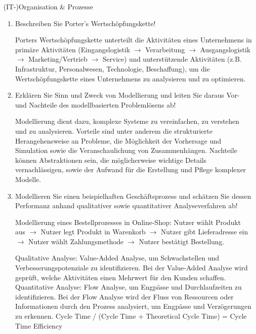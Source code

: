 \documentclass{article}
\begin{document}
\begin{exercise}{(IT-)Organisation \& Prozesse}
  \begin{enumerate}
    \item Beschreiben Sie Porter's Wertschöpfungskette!
          \begin{solution}
            Porters Wertschöpfungskette unterteilt die Aktivitäten eines Unternehmens in primäre Aktivitäten (Eingangslogistik $\to$ Verarbeitung $\to$ Ausgangslogistik $\to$ Marketing/Vertrieb $\to$ Service) und unterstützende Aktivitäten (z.B. Infrastruktur, Personalwesen, Technologie, Beschaffung), um die Wertschöpfungskette eines Unternehmens zu analysieren und zu optimieren.
          \end{solution}

    \item Erklären Sie Sinn und Zweck von Modellierung und leiten Sie daraus Vor- und Nachteile des modellbasierten Problemlösens ab!
          \begin{solution}
            Modellierung dient dazu, komplexe Systeme zu vereinfachen, zu verstehen und zu analysieren. Vorteile sind unter anderem die strukturierte Herangehensweise an Probleme, die Möglichkeit der Vorhersage und Simulation sowie die Veranschaulichung von Zusammenhängen. Nachteile können Abstraktionen sein, die möglicherweise wichtige Details vernachlässigen, sowie der Aufwand für die Erstellung und Pflege komplexer Modelle.
          \end{solution}

    \item Modellieren Sie einen beispielhaften Geschäftsprozess und schätzen Sie dessen Performanz anhand qualitativer sowie quantitativer Analyseverfahren ab!
          \begin{solution}
            Modellierung eines Bestellprozesses in Online-Shop: Nutzer wählt Produkt aus $\to$ Nutzer legt Produkt in Warenkorb $\to$ Nutzer gibt Lieferadresse ein $\to$ Nutzer wählt Zahlungsmethode $\to$ Nutzer bestätigt Bestellung.

            Qualitative Analyse: Value-Added Analyse, um Schwachstellen und Verbesserungspotenziale zu identifizieren. Bei der Value-Added Analyse wird geprüft, welche Aktivitäten einen Mehrwert für den Kunden schaffen.
            Quantitative Analyse: Flow Analyse, um Engpässe und Durchlaufzeiten zu identifizieren. Bei der Flow Analyse wird der Fluss von Ressourcen oder Informationen durch den Prozess analysiert, um Engpässe und Verzögerungen zu erkennen. Cycle Time / (Cycle Time + Theoretical Cycle Time) = Cycle Time Efficiency
          \end{solution}


\end{enumerate}
\end{exercise}
\end{document}
